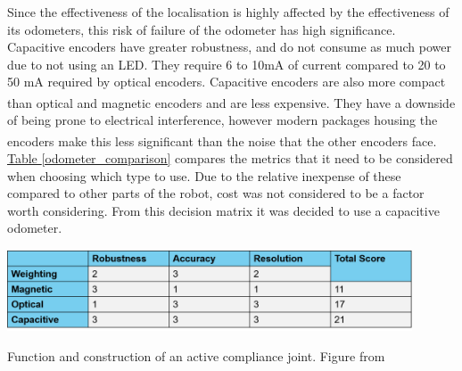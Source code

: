 \documentclass[11pt]{article}		%
\newcommand{\supercite}[1]{\textsuperscript{\cite{#1}}}		%
\newcommand{\tableref}[1]{\hyperref[#1]{Table \ref*{#1}}}     %
\begin{document}
	        Since the effectiveness of the localisation is highly affected by  the effectiveness of its odometers, this risk of failure of the odometer has high significance.
	        \\
	        Capacitive encoders have greater robustness, and do not consume as much power due to not using an LED. 
	        They require 6 to 10mA of current compared to 20 to 50 mA required by optical encoders.
	        Capacitive encoders are also more compact than optical and magnetic encoders and are less expensive\supercite{Encoders}. 
	        They have a downside of being prone to electrical interference, however modern packages housing the encoders make this less significant than the noise that the other encoders face.\supercite{Encoders}
	        \\
	        \tableref{odometer_comparison} compares the metrics that it need to be considered when choosing which type to use. 
	        Due to the relative inexpense of these compared to other parts of the robot, cost was not considered to be a factor worth considering. 
	        From this decision matrix it was decided to use a capacitive odometer. 
	        \begin{table}[h]
						\centering
							\includegraphics[width=0.9\textwidth]{Encoder comparison table}
							\caption{Function and construction of an active compliance joint. Figure from \cite{park2010normal}}
							\label{odometer_comparison}
					\end{table}
					
\end{document}
